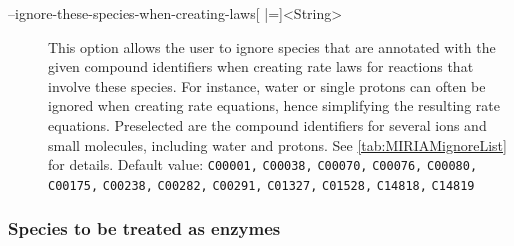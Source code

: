 \begin{description}
\item[--ignore-these-species-when-creating-laws{[} |={]}<String>]
  This option allows the user to ignore species that are annotated with the
  given compound identifiers when creating rate laws for reactions
  that involve these species. For instance, water or single protons
  can often be ignored when creating rate equations, hence simplifying
  the resulting rate equations. Preselected are the \KEGG compound
  identifiers for several ions and small molecules, including water and
  protons. See \vref{tab:MIRIAMignoreList} for details.
  Default value: \texttt{C00001,} \texttt{C00038,} \texttt{C00070,}
  \texttt{C00076,} \texttt{C00080,} \texttt{C00175,} \texttt{C00238,}
  \texttt{C00282,} \texttt{C00291,} \texttt{C01327,} \texttt{C01528,}
  \texttt{C14818,} \texttt{C14819}
\end{description}

\subsubsection{Species to be treated as enzymes}

